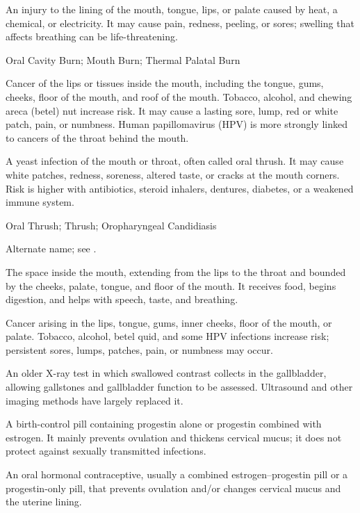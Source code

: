  An injury to the lining of the mouth, tongue, lips, or palate caused by heat, a chemical, or electricity. It may cause pain, redness, peeling, or sores; swelling that affects breathing can be life-threatening.

\synonyms
Oral Cavity Burn; Mouth Burn; Thermal Palatal Burn

 Cancer of the lips or tissues inside the mouth, including the tongue, gums, cheeks, floor of the mouth, and roof of the mouth. Tobacco, alcohol, and chewing areca (betel) nut increase risk. It may cause a lasting sore, lump, red or white patch, pain, or numbness. Human papillomavirus (HPV) is more strongly linked to cancers of the throat behind the mouth.

 A yeast infection of the mouth or throat, often called oral thrush. It may cause white patches, redness, soreness, altered taste, or cracks at the mouth corners. Risk is higher with antibiotics, steroid inhalers, dentures, diabetes, or a weakened immune system.

\synonyms
Oral Thrush; Thrush; Oropharyngeal Candidiasis

 Alternate name; see .

 The space inside the mouth, extending from the lips to the throat and bounded by the cheeks, palate, tongue, and floor of the mouth. It receives food, begins digestion, and helps with speech, taste, and breathing.

 Cancer arising in the lips, tongue, gums, inner cheeks, floor of the mouth, or palate. Tobacco, alcohol, betel quid, and some HPV infections increase risk; persistent sores, lumps, patches, pain, or numbness may occur.

 An older X-ray test in which swallowed contrast collects in the gallbladder, allowing gallstones and gallbladder function to be assessed. Ultrasound and other imaging methods have largely replaced it.

 A birth-control pill containing progestin alone or progestin combined with estrogen. It mainly prevents ovulation and thickens cervical mucus; it does not protect against sexually transmitted infections.

 An oral hormonal contraceptive, usually a combined estrogen--progestin pill or a progestin-only pill, that prevents ovulation and/or changes cervical mucus and the uterine lining.

